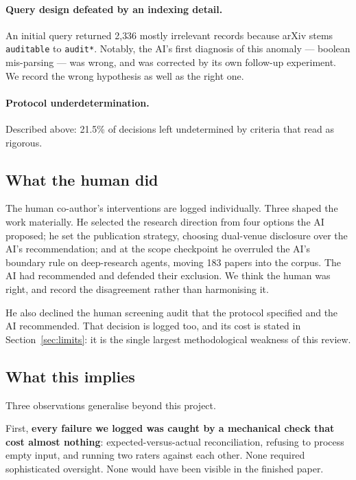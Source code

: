 \paragraph{Query design defeated by an indexing detail.} An initial query returned 2{,}336
mostly irrelevant records because arXiv stems \texttt{auditable} to \texttt{audit*}. Notably,
the AI's first diagnosis of this anomaly --- boolean mis-parsing --- was wrong, and was
corrected by its own follow-up experiment. We record the wrong hypothesis as well as the right
one.

\paragraph{Protocol underdetermination.} Described above: 21.5\% of decisions left
undetermined by criteria that read as rigorous.

\subsection{What the human did}

The human co-author's interventions are logged individually. Three shaped the work materially.
He selected the research direction from four options the AI proposed; he set the publication
strategy, choosing dual-venue disclosure over the AI's recommendation; and at the scope
checkpoint he overruled the AI's boundary rule on deep-research agents, moving 183 papers into
the corpus. The AI had recommended and defended their exclusion. We think the human was right,
and record the disagreement rather than harmonising it.

He also declined the human screening audit that the protocol specified and the AI recommended.
That decision is logged too, and its cost is stated in Section~\ref{sec:limits}: it is the
single largest methodological weakness of this review.

\subsection{What this implies}

Three observations generalise beyond this project.

First, \textbf{every failure we logged was caught by a mechanical check that cost almost
nothing}: expected-versus-actual reconciliation, refusing to process empty input, and running
two raters against each other. None required sophisticated oversight. None would have been
visible in the finished paper.

